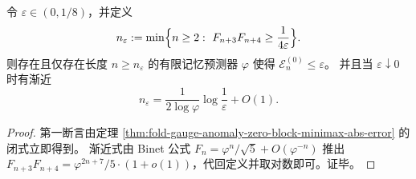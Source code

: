 \begin{corollary}[达到给定误差阈值所需的零块记忆深度]\label{cor:fold-gauge-anomaly-zero-block-memory-depth}
令 \(\varepsilon\in(0,1/8)\)，并定义
\[
n_{\varepsilon}:=\min\Bigl\{n\ge 2:\ F_{n+3}F_{n+4}\ge \frac{1}{4\varepsilon}\Bigr\}.
\]
则存在且仅存在长度 \(n\ge n_{\varepsilon}\) 的有限记忆预测器 \(\varphi\) 使得 \(\mathcal E_n^{(0)}\le \varepsilon\)。
并且当 \(\varepsilon\downarrow 0\) 时有渐近
\[
n_{\varepsilon}=\frac{1}{2\log\varphi}\log\frac{1}{\varepsilon}+O(1).
\]
\end{corollary}
\begin{proof}
第一断言由定理 \ref{thm:fold-gauge-anomaly-zero-block-minimax-abs-error} 的闭式立即得到。
渐近式由 Binet 公式 \(F_n=\varphi^n/\sqrt5+O(\varphi^{-n})\) 推出
\(
F_{n+3}F_{n+4}=\varphi^{2n+7}/5\cdot(1+o(1))
\)，代回定义并取对数即可。证毕。
\end{proof}

